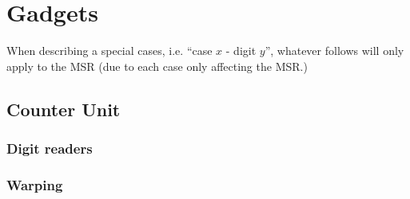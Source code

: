 \section{Gadgets}
\label{gadgets}



\newcommand{\warpunit}{{\tt Warp\_Unit}}
\newcommand{\prewarp}{{\tt Pre\_Warp}}
\newcommand{\firstwarp}{{\tt First\_Warp}}
\newcommand{\warpbridge}{{\tt Warp\_Bridge}}
\newcommand{\secondwarp}{{\tt Second\_Warp}}
\newcommand{\postwarp}{{\tt Post\_Warp}}

\newcommand{\dtop}{{\tt Digit\_Top}}
\newcommand{\dwriter}{{\tt Digit\_Writer}}
\newcommand{\dreader}{{\tt Digit\_Reader}}

\newcommand{\returnfromdonereadnextrow}{{\tt Return\_From\_Digit1\_Read\_Next\_Row}}
\newcommand{\returnfromdtworeadnextrow}{{\tt Return\_From\_Digit2\_Read\_Next\_Row}}
\newcommand{\returnfromdthreereadnextrow}{{\tt Return\_From\_Digit3\_Read\_Next\_Row}}

\newcommand{\returnfromdonereaddtwo}{{\tt Return\_From\_Digit1\_Read\_Digit2}}
\newcommand{\returnfromdonereaddtwocasetwo}{{\tt Return\_From\_Digit1\_Read\_Digit2\_Case2}}
\newcommand{\returnfromdtworeaddthree}{{\tt Return\_From\_Digit2\_Read\_Digit3}}
\newcommand{\returnfromdthreereaddone}{{\tt Return\_From\_Digit3\_Read\_Digit1}}

\newcommand{\inc}{{\tt carry}}

\newcommand{\dtopdonecasetwo}{{\tt Digit\_Top\_Digit1\_Case2}}
\newcommand{\dtopdtwocasetwo}{{\tt Digit\_Top\_Digit2\_Case2}}
\newcommand{\dtopdthreecasethree}{{\tt Digit\_Top\_Digit3\_Case3}}

When describing a special cases, i.e. ``case $x$ - digit $y$'', whatever follows
will only apply to the MSR (due to each case only affecting the MSR.)

\subsection{ Counter Unit }




    \subsubsection{ Digit readers }

    \subsubsection{ Warping }

